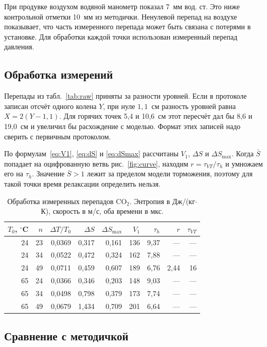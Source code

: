 \documentclass[12pt,a4paper]{article}
\newcommand{\Sb}{\bar S}
\newcommand{\dSmax}{\Delta S_{\max}}
\begin{document}
При продувке воздухом водяной манометр показал 7~мм вод. ст.
Это ниже контрольной отметки 10~мм из методички. Ненулевой перепад на воздухе
показывает, что часть измеренного перепада может быть связана с потерями
в установке. Для обработки каждой точки использован измеренный перепад давления.

\subsection{Обработка измерений}

Перепады из табл.~\ref{tab:raw} приняты за разности уровней. Если
в протоколе записан отсчёт одного колена $Y$, при нуле $1{,}1$~см
разность уровней равна $X=2(Y-1{,}1)$. Для горячих точек 5,4 и 10,6~см
этот пересчёт дал бы 8,6 и 19,0~см и увеличил бы расхождение с моделью.
Формат этих записей надо сверить с первичным протоколом.

По формулам~\eqref{eq:V1}, \eqref{eq:dS} и \eqref{eq:dSmax} рассчитаны
$V_1$, $\Delta S$ и $\dSmax$. Когда $\Sb$ попадает на оцифрованную
ветвь рис.~\ref{fig:curve}, находим $r=\tau_{VT}/\tau_h$ и умножаем
его на $\tau_h$. Значение $\Sb>1$ лежит за пределом модели торможения,
поэтому для такой точки время релаксации определить нельзя.

\begin{table}[H]
\centering
\small
\caption{Обработка измеренных перепадов CO$_2$. Энтропия в Дж/(кг$\cdot$К),
скорость в м/с, оба времени в мкс.}
\begin{tabular}{rrrrrrrrr}
\toprule
$T_0$, $^\circ$C & $n$ & $\Delta T/T_0$ & $\Delta S$ & $\dSmax$
 & $V_1$ & $\tau_h$ & $r$ & $\tau_{VT}$ \\
\midrule
24 & 23 & 0,0369 & 0,317 & 0,161 & 136 & 9,37 & --- & --- \\
24 & 34 & 0,0522 & 0,472 & 0,324 & 162 & 7,88 & --- & --- \\
24 & 49 & 0,0711 & 0,459 & 0,607 & 189 & 6,76 & 2,44 & 16 \\
\midrule
65 & 24 & 0,0366 & 0,346 & 0,203 & 148 & 9,03 & --- & --- \\
65 & 34 & 0,0498 & 0,798 & 0,379 & 173 & 7,74 & --- & --- \\
65 & 49 & 0,0679 & 1,434 & 0,709 & 201 & 6,64 & --- & --- \\
\bottomrule
\end{tabular}
\end{table}

\subsection{Сравнение с методичкой}
\end{document}
